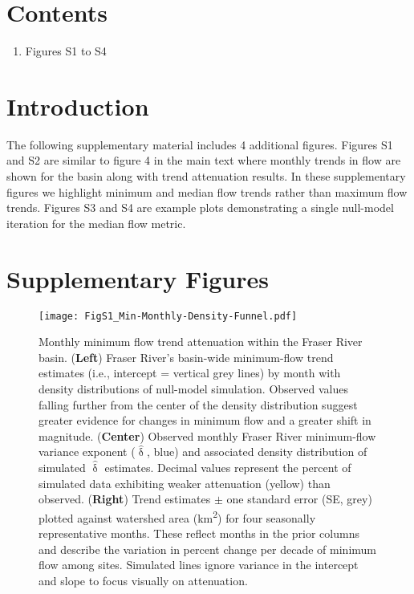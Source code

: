 \documentclass[draft]{agujournal}
\begin{document}


\section*{Contents}

\begin{enumerate}
\item Figures S1 to S4
\end{enumerate}

\section*{Introduction}
The following supplementary material includes 4 additional figures. Figures S1 and S2 are similar to figure 4 in the main text where monthly trends in flow are shown for the basin along with trend attenuation results. In these supplementary figures we highlight minimum and median flow trends rather than maximum flow trends. Figures S3 and S4 are example plots demonstrating a single null-model iteration for the median flow metric.

\section{Supplementary Figures}
\begin{figure}[h]
	\centerline{\texttt{[image: FigS1\_Min-Monthly-Density-Funnel.pdf]}}
	\caption{Monthly minimum flow trend attenuation within the Fraser River basin. (\textbf{Left}) Fraser River's basin-wide minimum-flow trend estimates (i.e., intercept = vertical grey lines) by month with density distributions of null-model simulation. Observed values falling further from the center of the density distribution suggest greater evidence for changes in minimum flow and a greater shift in magnitude. (\textbf{Center}) Observed monthly Fraser River minimum-flow variance exponent ($\hat{\updelta}$, blue) and associated density distribution of simulated $\hat{\updelta}$ estimates. Decimal values represent the percent of simulated data exhibiting weaker attenuation (yellow) than observed. (\textbf{Right}) Trend estimates $\pm$ one standard error (SE, grey) plotted against watershed area (km\textsuperscript{2}) for four seasonally representative months. These reflect months in the prior columns and describe the variation in percent change per decade of minimum flow among sites. Simulated lines ignore variance in the intercept and slope to focus visually on attenuation.}
	\label{S1}
\end{figure}
\end{document}
